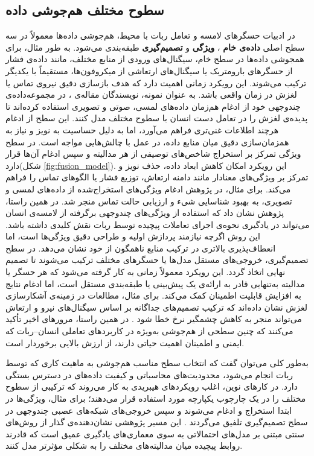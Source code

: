  \subsection{سطوح مختلف هم‌جوشی داده}
در ادبیات حسگرهای لامسه و تعامل ربات با محیط، هم‌جوشی داده‌ها معمولاً در سه سطح اصلی
 \textbf{داده‌ی خام}
، \textbf{ویژگی} 
و \textbf{تصمیم‌گیری}
  طبقه‌بندی می‌شود. به طور مثال، برای همجوشی داده‌ها در سطح خام، سیگنال‌های ورودی از منابع مختلف، مانند داده‌ی فشار از حسگرهای بارومتریک یا سیگنال‌های ارتعاشی از میکروفون‌ها، مستقیماً با یکدیگر ترکیب می‌شوند. این رویکرد زمانی اهمیت دارد که
 هدف بازسازی دقیق نیروی تماس یا لغزش در زمان واقعی باشد. به عنوان نمونه، نویسندگان مقاله‌ی
  \cite{devillard2025tactile}
   ، در مجموعه‌داده‌ی چندوجهی خود از ادغام هم‌زمان داده‌های لمسی، صوتی و تصویری استفاده کرده‌اند تا پدیده‌ی لغزش را در تعامل دست انسان با سطوح مختلف مدل کنند. این سطح از ادغام هرچند اطلاعات غنی‌تری فراهم می‌آورد، اما به دلیل حساسیت به نویز و نیاز به همزمان‌سازی دقیق میان منابع داده، در عمل با چالش‌هایی مواجه است.
در سطح ویژگی  تمرکز بر استخراج شاخص‌های توصیفی از هر مدالیته و سپس ادغام آن‌ها قرار دارد(شکل \ref{fig:fusion_model}). این رویکرد امکان کاهش ابعاد داده، حذف نویز و تمرکز بر ویژگی‌های معنادار مانند دامنه ارتعاش، توزیع فشار یا الگوهای تماس را فراهم می‌کند. برای مثال، در پژوهش \cite{feng2020center} ادغام ویژگی‌های استخراج‌شده از داده‌های لمسی و تصویری، به بهبود شناسایی شیء و ارزیابی حالت تماس منجر شد. در همین راستا، پژوهش
 \cite{yu2023mimictouch} 
 نشان داد که استفاده از ویژگی‌های چندوجهی برگرفته از لامسه‌ی انسان می‌تواند در یادگیری نحوه‌ی اجرای تعاملات پیچیده توسط ربات نقش کلیدی داشته باشد. این روش اگرچه نیازمند پردازش اولیه و طراحی دقیق ویژگی‌ها است، اما انعطاف‌پذیری بالاتری در ترکیب منابع ناهمگون از خود نشان می‌دهد.
در سطح تصمیم‌گیری، خروجی‌های مستقل مدل‌ها یا حسگرهای مختلف ترکیب می‌شوند تا تصمیم نهایی اتخاذ گردد. این رویکرد معمولاً زمانی به کار گرفته می‌شود که هر حسگر یا مدالیته به‌تنهایی قادر به ارائه‌ی یک پیش‌بینی یا طبقه‌بندی مستقل است، اما ادغام نتایج به افزایش قابلیت اطمینان کمک می‌کند. برای مثال، مطالعات در زمینه‌ی آشکارسازی لغزش نشان داده‌اند که ترکیب تصمیم‌های جداگانه بر اساس سیگنال‌های نیرو و ارتعاش می‌تواند منجر به کاهش چشمگیر نرخ خطا شود \cite{li2018slip}. در همین راستا، مرورهای اخیر \cite{wang2024multimodal} تأکید می‌کنند که چنین سطحی از هم‌جوشی به‌ویژه در کاربردهای تعاملی انسان–ربات که ایمنی و اطمینان اهمیت حیاتی دارند، از ارزش بالایی برخوردار است.

به‌طور کلی می‌توان گفت که انتخاب سطح مناسب هم‌جوشی به ماهیت کاری که توسط ربات انجام می‌شود، محدودیت‌های محاسباتی و کیفیت داده‌های در دسترس بستگی دارد. در کارهای نوین، اغلب رویکردهای هیبریدی به کار می‌روند که ترکیبی از سطوح مختلف را در یک چارچوب یکپارچه مورد استفاده قرار می‌دهند؛ برای مثال، ویژگی‌ها در ابتدا استخراج و ادغام می‌شوند و سپس خروجی‌های شبکه‌های عصبی چندوجهی در سطح تصمیم‌گیری تلفیق می‌گردند \cite{yu2023mimictouch}. این مسیر پژوهشی نشان‌دهنده‌ی گذار از روش‌های سنتی مبتنی بر مدل‌های احتمالاتی به سوی معماری‌های یادگیری عمیق است که قادرند روابط پیچیده میان مدالیته‌های مختلف را به شکلی مؤثرتر مدل کنند.

